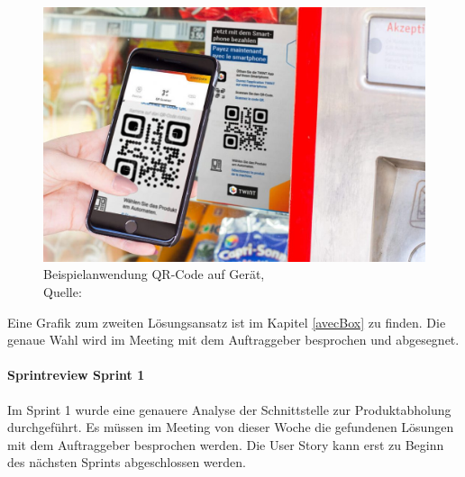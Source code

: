 \begin{figure}[H]
	\centering
	\includegraphics[scale=0.3]{images/QR-CodeOnMachine.jpg}
	\caption[Beispielanwendung QR-Code auf Gerät]{Beispielanwendung QR-Code auf Gerät,\\ Quelle: \cite{imageQRCodeTwint}}
	\label{img: Beispielanwendung QR-Code auf Geraet}
\end{figure}
Eine Grafik zum zweiten Lösungsansatz ist im Kapitel \ref{avecBox} zu finden. 
Die genaue Wahl wird im Meeting mit dem Auftraggeber besprochen und abgesegnet. 

\paragraph{Sprintreview Sprint 1}
Im Sprint 1 wurde eine genauere Analyse der Schnittstelle zur Produktabholung durchgeführt. Es müssen im Meeting von dieser Woche die gefundenen Lösungen mit dem Auftraggeber besprochen werden. Die \gls{User Story} kann erst zu Beginn des nächsten Sprints abgeschlossen werden. 

